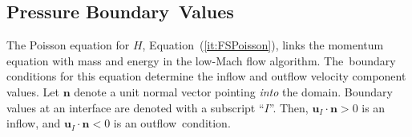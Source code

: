 \documentclass[atmosphere,article,accept,moreauthors,pdftex]{Definitions/mdpi}
\begin{document}
\begin{paracol}{2}




\subsection{Pressure Boundary~Values}

The Poisson equation for $H$, Equation~(\ref{it:FSPoisson}), links the momentum equation with mass and energy in the low-Mach flow algorithm.  The~boundary conditions for this equation determine the inflow and outflow velocity component values.  Let $\mathbf{n}$ denote a unit normal vector pointing \emph{into} the domain.  Boundary values at an interface are denoted with a subscript ``$I$''.  Then, $\mathbf{u}_I\cdot\mathbf{n}>0$ is an inflow, and $\mathbf{u}_I\cdot\mathbf{n}<0$ is an outflow~condition.


\end{paracol}
\end{document}
